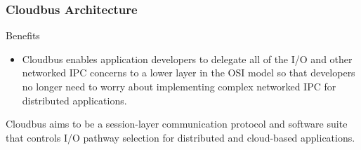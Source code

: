 \begin{frame}
	\frametitle{Cloudbus Architecture}
	\begin{block}{Benefits}
		\begin{itemize}
			\item Cloudbus enables application developers to delegate all of the I/O and other networked IPC concerns to a %
			lower layer in the OSI model so that developers no longer need to worry about implementing complex networked IPC for distributed %
			applications. 
		\end{itemize}
		Cloudbus aims to be a session-layer communication protocol and software suite that controls I/O pathway selection for distributed %
		and cloud-based applications. 
	\end{block}
\end{frame}